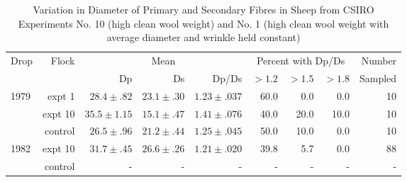 %

\begin{landscape}
\begin{table} 
\centering
\caption{Variation in Diameter of Primary and Secondary Fibres in Sheep from
         CSIRO Experiments No. 10 (high clean wool weight) and No. 1 (high
	 clean wool weight with average diameter and wrinkle held constant)}
\label{tb:6} 
\vspace{0.1in}

\begin{tabular}{l|r|rrr|rrr|r}  \hline
 Drop & Flock & \multicolumn{3}{c|}{Mean} &  \multicolumn{3}{c|}{Percent with Dp/Ds} &  Number \\ \cline{3-8}
        &       & Dp & Ds & Dp/Ds &   $>1.2$ &  $>1.5$ & $>1.8$ & Sampled \\ \hline

  1979   & expt 1  & $28.4\pm .82$  & $23.1\pm.30$  & $1.23\pm.037$  & 60.0 &   0.0  &  0.0 & 10 \\
  
         & expt 10 & $35.5\pm1.15$  & $15.1\pm.47$  & $1.41\pm.076$  & 40.0 &   20.0 & 10.0 & 10 \\
  
         & control & $26.5\pm .96$  & $21.2\pm.44$  & $1.25\pm.045$  & 50.0 &   10.0 &  0.0 & 10 \\ \hline
 
  
   1982  & expt 10 & $31.7\pm .45$  & $26.6\pm.26$  & $1.21\pm.020$  & 39.8 &   5.7  &  0.0 & 88 \\
  
         & control &     -      &     -     &     -      &   -  &   -    &  -   & - \\ \hline
\end{tabular}
\end{table}
\end{landscape}

%
